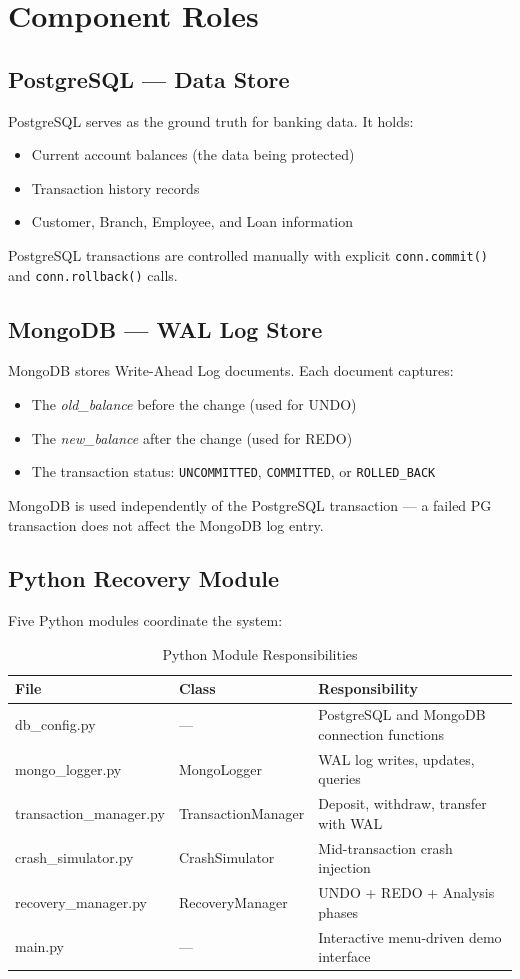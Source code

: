 \section{Component Roles}

\subsection{PostgreSQL --- Data Store}
PostgreSQL serves as the ground truth for banking data. It holds:
\begin{itemize}
  \item Current account balances (the data being protected)
  \item Transaction history records
  \item Customer, Branch, Employee, and Loan information
\end{itemize}
PostgreSQL transactions are controlled manually with explicit
\texttt{conn.commit()} and \texttt{conn.rollback()} calls.

\subsection{MongoDB --- WAL Log Store}
MongoDB stores Write-Ahead Log documents. Each document captures:
\begin{itemize}
  \item The \textit{old\_balance} before the change (used for UNDO)
  \item The \textit{new\_balance} after the change (used for REDO)
  \item The transaction status: \texttt{UNCOMMITTED}, \texttt{COMMITTED},
        or \texttt{ROLLED\_BACK}
\end{itemize}
MongoDB is used independently of the PostgreSQL transaction --- a failed
PG transaction does not affect the MongoDB log entry.

\subsection{Python Recovery Module}
Five Python modules coordinate the system:

\begin{table}[H]
\centering
\caption{Python Module Responsibilities}
\begin{tabularx}{\textwidth}{llX}
\toprule
\textbf{File} & \textbf{Class} & \textbf{Responsibility} \\
\midrule
db\_config.py & --- & PostgreSQL and MongoDB connection functions \\
mongo\_logger.py & MongoLogger & WAL log writes, updates, queries \\
transaction\_manager.py & TransactionManager & Deposit, withdraw, transfer with WAL \\
crash\_simulator.py & CrashSimulator & Mid-transaction crash injection \\
recovery\_manager.py & RecoveryManager & UNDO + REDO + Analysis phases \\
main.py & --- & Interactive menu-driven demo interface \\
\bottomrule
\end{tabularx}
\end{table}

